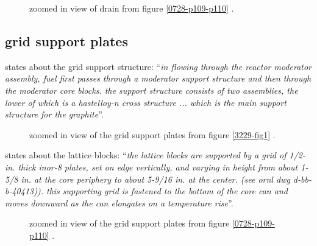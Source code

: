 \documentclass{article}
\newcommand*{\mrsarchive}{../../msr-archive}%
\begin{document}
\begin{figure}[H]
  \centering
  \caption{zoomed in view of drain from figure \ref{0728-p109-p110} \parencite[page 110]{ornl-tm-0728}.}
\end{figure}



\subsection{grid support plates}
\parencite[page 20]{ornl-tm-3229} states about the grid support structure:
\enquote{\textit{in flowing through the reactor moderator assembly, fuel first passes through a moderator support structure and then through the moderator core blocks. the support structure consists of two assemblies, the lower of which is a hastelloy-n cross structure ... which is the main support structure for the graphite}}.

\begin{figure}[H]
  \centering
  \caption{zoomed in view of the grid support plates from figure \ref{3229-fig1} \parencite[figure 1]{ornl-tm-3229}.}
\end{figure}

\parencite[page 81]{ornl-tm-0728} states about the lattice blocks:
\enquote{\textit{the lattice blocks are supported by a grid of 1/2-in. thick inor-8 plates, set on edge vertically, and varying in height from about 1-5/8 in. at the core periphery to about 5-9/16 in. at the center. (see ornl dwg d-bb-b-40413)). this supporting grid is fastened to the bottom of the core can and moves downward as the can elongates on a temperature rise}}.

\begin{figure}[H]
  \centering
  \caption{zoomed in view of the grid support plates from figure \ref{0728-p109-p110} \parencite[page 110]{ornl-tm-0728}.}
\end{figure}
\end{document}
